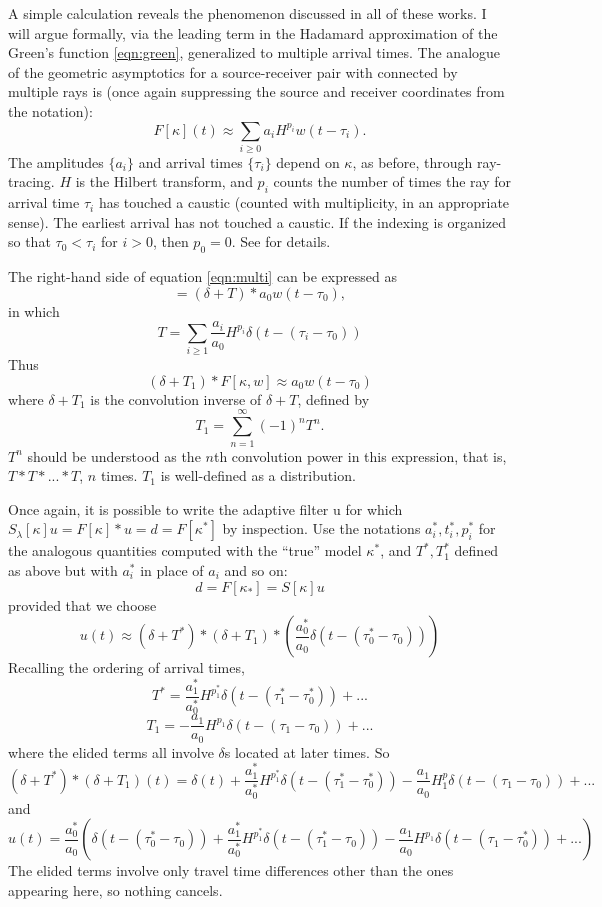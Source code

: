 A simple calculation reveals the phenomenon discussed in all of these
works. I will argue formally, via the leading term in the Hadamard
approximation of the Green's function \ref{eqn:green}, generalized to
multiple arrival times. The analogue of the geometric asymptotics for a source-receiver
pair with connected by multiple rays is (once again suppressing the
source and receiver coordinates from the notation):
\begin{equation}
  \label{eqn:multi}
  F[\kappa](t) \approx \sum_{i \ge 0} a_i H^{p_i}w(t-\tau_i).
\end{equation}
The amplitudes $\{a_i\}$ and arrival times $\{\tau_i\}$ depend on $\kappa$, as
before, through ray-tracing. $H$ is the Hilbert transform, and $p_i$
counts the number of times the ray for arrival time $\tau_i$ has
touched a caustic (counted with multiplicity, in an appropriate
sense). The earliest arrival has not touched a caustic. If the
indexing is organized so that $\tau_0 < \tau_i$ for $i>0$, then
$p_0=0$. See \cite{Friedlander:75} for details.

The right-hand side of equation \ref{eqn:multi} can be expressed as
\[
  = (\delta + T) * a_0w(t-\tau_0),
\]
in which 
\[
  T = \sum_{i \ge 1}
  \frac{a_i}{a_0}H^{p_i}\delta(t-(\tau_i-\tau_0))
\]
Thus
\begin{equation}
  \label{eqn:unwrap}
  (\delta +T_1) * F[\kappa,w] \approx  a_0w(t-\tau_0)
\end{equation}
where $\delta + T_1$ is the convolution inverse of $\delta + T$,
defined by 
\[
  T_1 = \sum_{n=1}^{\infty} (-1)^n T^n.
\]
$T^n$ should be understood as the $n$th convolution power in this
expression, that is, $T*T*...*T$, $n$ times. $T_1$ is well-defined as a distribution.

Once again, it is possible to write the adaptive filter u for which $S_{\lambda}[\kappa]u = F[\kappa]*u = d =
F[\kappa^*]$ by inspection. Use the notations $a^*_i, t^*_i, p^*_i$ for
the analogous quantities computed with the ``true'' model $\kappa^*$, and
$T^*, T_1^*$ defined as above but with $a^*_i$ in place of $a_i$ and so
on:
\[
  d = F[\kappa_*]= S[\kappa] u
\]
provided that we choose
\begin{equation}
  \label{eqn:notl2again}
u(t) \approx (\delta + T^*)*(\delta +
T_1)*\left(\frac{a^*_0}{a_0}\delta(t - (\tau^*_0-\tau_0))\right)
\end{equation}
Recalling the ordering of arrival times, 
\[
  T^* = \frac{a^*_1}{a^*_0}H^{p_1^*} \delta(t-(\tau^*_1-\tau^*_0)) + ...
\]
\[
  T_1 = -\frac{a_1}{a_0}H^{p_1} \delta(t-(\tau_1-\tau_0)) + ...
\]
where the elided terms all involve $\delta$s located at later times.
So
\[
  (\delta + T^*)*(\delta + T_1)(t) = \delta(t)  +  \frac{a^*_1}{a^*_0}
  H^{p_1^*}\delta(t-(\tau^*_1-\tau^*_0)) -\frac{a_1}{a_0}H^p_1
  \delta(t-(\tau_1-\tau_0)) + ...
\]
and
\begin{equation}
  \label{eqn:notl2explicit}
  u(t) = \frac{a^*_0}{a_0}\left(\delta(t - (\tau^*_0-\tau_0)) +
    \frac{a^*_1}{a^*_0}H^{p_1^*}\delta(t-(\tau^*_1-\tau_0)) -
    \frac{a_1}{a_0}H^{p_1}\delta(t-(\tau_1-\tau_0^*)) + ...\right)
\end{equation}
The elided terms involve only travel time differences other than the
ones appearing here, so nothing cancels.

